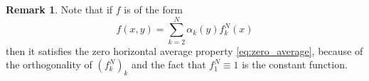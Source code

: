\documentclass[11pt,a4paper,reqno]{amsart}
\theoremstyle{definition}
\newtheorem{Remark}[Theorem]{Remark}
\newcommand{\bbR}{{\ensuremath{\mathbb R}} }
\newcommand{\bbZ}{{\ensuremath{\mathbb Z}} }
\begin{document}
\begin{Remark}
Note that if $f$ is of the form 
	\[ f (x,y) = \sum_{k=2}^N \alpha_k (y) f_k^N(x) \] 
then it satisfies the zero horizontal average property \eqref{eq:zero_average}, 
because of the orthogonality of $(f^N_k)_k$ and the fact that $f_1^N \equiv 1 $ is the constant function.
\end{Remark}
\end{document}
